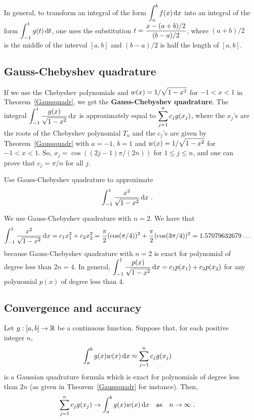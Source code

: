 \begin{rmk}
In general, to transform an integral of the form
$\displaystyle \int_a^b f(x) \,\mathrm{d}x$ into an integral of the form
$\displaystyle \int_{-1}^1 g(t) \,\mathrm{d}t$, one uses the substitution
$\displaystyle t = \frac{x - (a+b)/2}{(b-a)/2}$,
where $(a+b)/2$ is the middle of the interval $[a,b]$ and
$(b-a)/2$ is half the length of $[a,b]$.
\end{rmk}

\subsection{Gauss-Chebyshev quadrature}

If we use the Chebyshev polynomials and
$\displaystyle w(x) = 1/\sqrt{1-x^2}$ for
$-1<x<1$ in Theorem~\ref{Gaussquadr}, we get the
{\bfseries Gauss-Chebyshev quadrature}.  The integral 
$\displaystyle \int_{-1}^1 \frac{g(x)}{\sqrt{1-x^2}}\,\mathrm{d}x$ is
approximately equal to $\displaystyle \sum_{j=1}^n c_j g(x_j)$, where the
$x_j$'s are the roots of the Chebyshev polynomial $T_n$ and the
$c_j$'s are given by Theorem~\ref{Gaussquadr} with $a = -1$, $b=1$ and
$\displaystyle w(x) = 1/\sqrt{1-x^2}$ for $-1<x<1$.  So, 
$x_j= \cos((2j-1)\pi/(2n))$ for $1 \leq j \leq n$, and one can prove that
$c_j = \pi/n$ for all $j$.

\begin{egg}
Use Gauss-Chebyshev quadrature to approximate
\[
\int_{-1}^1 \frac{x^2}{\sqrt{1-x^2}}\dx{x}\ .
\]

We use Gauss-Chebyshev quadrature with $n=2$.  We have that
\[
\int_{-1}^1 \frac{x^2}{\sqrt{1-x^2}}\,\mathrm{d}x
= c_1 x_1^2 + c_2 x_2^2
= \frac{\pi}{2}(\cos(\pi/4))^2 + \frac{\pi}{2}(\cos(3\pi/4))^2
= 1.57079632679\ldots
\]
because Gauss-Chebyshev quadrature with $n=2$ is exact for polynomial
of degree less than $2n = 4$.  In general,
$\displaystyle \int_{-1}^1 \frac{p(x)}{\sqrt{1-x^2}}\,\mathrm{d}x
= c_1 p(x_1) + c_2 p(x_2)$
for any polynomial $p(x)$ of degree less than $4$.
\end{egg}

\subsection{Convergence and accuracy}

\begin{theorem}
Let $g:[a,b]\rightarrow \mathbb{R}$ be a continuous function.  Suppose that,
for each positive integer $n$,
\[
\int_a^b g(x) w(x)\,\mathrm{d}x \approx \sum_{j=1}^n c_j g(x_j) 
\]
is a Gaussian quadrature formula which is exact for polynomials of
degree less than $2n$ (as given in Theorem~\ref{Gaussquadr} for
instance).  Then,
\[
\sum_{j=1}^n c_j g(x_j)  \rightarrow \int_a^b g(x) w(x)\,\mathrm{d}x \quad 
\text{as} \quad n\rightarrow \infty \ .
\]
\end{theorem}

